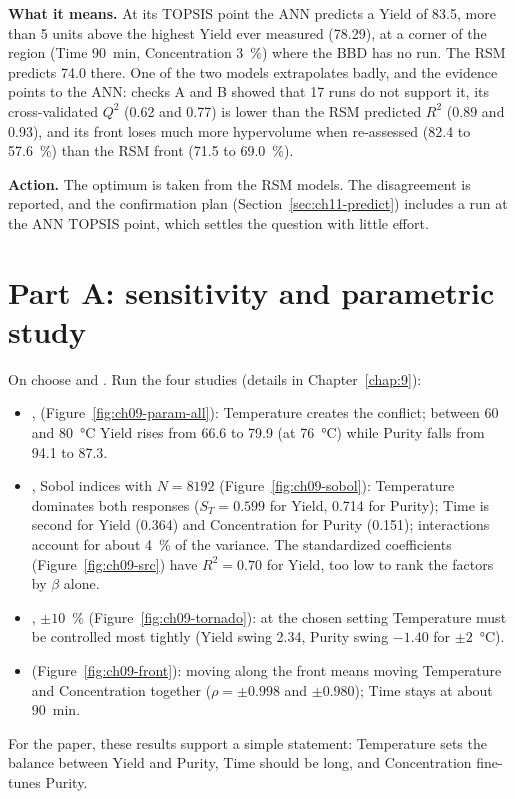 \textbf{What it means.} At its TOPSIS point the ANN predicts a Yield of 83.5, more than 5 units above the highest
Yield ever measured (78.29), at a corner of the region (Time 90~min, Concentration 3~\%) where the BBD has no run. The
RSM predicts 74.0 there. One of the two models extrapolates badly, and the evidence points to the ANN: checks A and B
showed that 17 runs do not support it, its cross-validated $Q^2$ (0.62 and 0.77) is lower than the RSM predicted $R^2$
(0.89 and 0.93), and its front loses much more hypervolume when re-assessed (82.4 to 57.6~\%) than the RSM front (71.5
to 69.0~\%).

\textbf{Action.} The optimum is taken from the RSM models. The disagreement is reported, and the confirmation plan
(Section~\ref{sec:ch11-predict}) includes a run at the ANN TOPSIS point, which settles the question with little effort.

\section{Part A: sensitivity and parametric study}
\label{sec:ch11-sens}
On  choose   and  . Run the four studies (details in Chapter~\ref{chap:9}):
\begin{itemize}
  \item {},  (Figure~\ref{fig:ch09-param-all}): Temperature
        creates the conflict; between 60 and 80~°C Yield rises from 66.6 to 79.9 (at 76~°C) while Purity falls from
        94.1 to 87.3.
  \item {}, Sobol indices with $N=8192$ (Figure~\ref{fig:ch09-sobol}): Temperature dominates
        both responses ($S_T=0.599$ for Yield, 0.714 for Purity); Time is second for Yield (0.364) and Concentration for
        Purity (0.151); interactions account for about 4~\% of the variance. The standardized coefficients
        (Figure~\ref{fig:ch09-src}) have $R^2=0.70$ for Yield, too low to rank the factors by $\beta$ alone.
  \item {}, $\pm10$~\% (Figure~\ref{fig:ch09-tornado}): at the chosen setting
        Temperature must be controlled most tightly (Yield swing 2.34, Purity swing $-1.40$ for $\pm2$~°C).
  \item {} (Figure~\ref{fig:ch09-front}): moving along the front means moving Temperature
        and Concentration together ($\rho=\pm0.998$ and $\pm0.980$); Time stays at about 90~min.
\end{itemize}
For the paper, these results support a simple statement: Temperature sets the balance between Yield and Purity, Time
should be long, and Concentration fine-tunes Purity.

